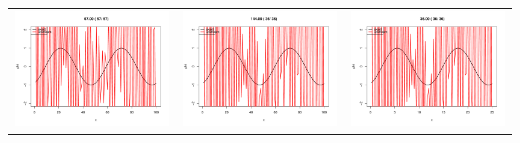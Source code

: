 \documentclass[a4paper,fleqn]{article}
\begin{document}
\begin{enumerate}
\begin{center}
\begin{tabular}{ccc}
				\includegraphics[scale=0.3]{upstream_instab1}	&	\includegraphics[scale=0.3]{upstream_instab2} & \includegraphics[scale=0.3]{upstream_instab3}\\

\end{tabular}
\end{center}
\end{enumerate}
\end{document}
